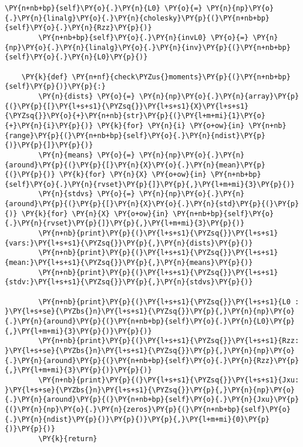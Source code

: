 \begin{tcolorbox}[breakable, size=fbox, boxrule=1pt, pad at break*=1mm,colback=cellbackground, colframe=cellborder]
\begin{Verbatim}[commandchars=\\\{\}]
        \PY{n+nb+bp}{self}\PY{o}{.}\PY{n}{L0} \PY{o}{=} \PY{n}{np}\PY{o}{.}\PY{n}{linalg}\PY{o}{.}\PY{n}{cholesky}\PY{p}{(}\PY{n+nb+bp}{self}\PY{o}{.}\PY{n}{Rzz}\PY{p}{)}
        \PY{n+nb+bp}{self}\PY{o}{.}\PY{n}{invL0} \PY{o}{=} \PY{n}{np}\PY{o}{.}\PY{n}{linalg}\PY{o}{.}\PY{n}{inv}\PY{p}{(}\PY{n+nb+bp}{self}\PY{o}{.}\PY{n}{L0}\PY{p}{)}

    \PY{k}{def} \PY{n+nf}{check\PYZus{}moments}\PY{p}{(}\PY{n+nb+bp}{self}\PY{p}{)}\PY{p}{:}
        \PY{n}{dists} \PY{o}{=} \PY{n}{np}\PY{o}{.}\PY{n}{array}\PY{p}{(}\PY{p}{[}\PY{l+s+s1}{\PYZsq{}}\PY{l+s+s1}{X}\PY{l+s+s1}{\PYZsq{}}\PY{o}{+}\PY{n+nb}{str}\PY{p}{(}\PY{l+m+mi}{1}\PY{o}{+}\PY{n}{i}\PY{p}{)} \PY{k}{for} \PY{n}{i} \PY{o+ow}{in} \PY{n+nb}{range}\PY{p}{(}\PY{n+nb+bp}{self}\PY{o}{.}\PY{n}{ndist}\PY{p}{)}\PY{p}{]}\PY{p}{)}
        \PY{n}{means} \PY{o}{=} \PY{n}{np}\PY{o}{.}\PY{n}{around}\PY{p}{(}\PY{p}{[}\PY{n}{X}\PY{o}{.}\PY{n}{mean}\PY{p}{(}\PY{p}{)} \PY{k}{for} \PY{n}{X} \PY{o+ow}{in} \PY{n+nb+bp}{self}\PY{o}{.}\PY{n}{rvset}\PY{p}{]}\PY{p}{,}\PY{l+m+mi}{3}\PY{p}{)}
        \PY{n}{stdvs} \PY{o}{=} \PY{n}{np}\PY{o}{.}\PY{n}{around}\PY{p}{(}\PY{p}{[}\PY{n}{X}\PY{o}{.}\PY{n}{std}\PY{p}{(}\PY{p}{)} \PY{k}{for} \PY{n}{X} \PY{o+ow}{in} \PY{n+nb+bp}{self}\PY{o}{.}\PY{n}{rvset}\PY{p}{]}\PY{p}{,}\PY{l+m+mi}{3}\PY{p}{)}
        \PY{n+nb}{print}\PY{p}{(}\PY{l+s+s1}{\PYZsq{}}\PY{l+s+s1}{vars:}\PY{l+s+s1}{\PYZsq{}}\PY{p}{,}\PY{n}{dists}\PY{p}{)}
        \PY{n+nb}{print}\PY{p}{(}\PY{l+s+s1}{\PYZsq{}}\PY{l+s+s1}{mean:}\PY{l+s+s1}{\PYZsq{}}\PY{p}{,}\PY{n}{means}\PY{p}{)}
        \PY{n+nb}{print}\PY{p}{(}\PY{l+s+s1}{\PYZsq{}}\PY{l+s+s1}{stdv:}\PY{l+s+s1}{\PYZsq{}}\PY{p}{,}\PY{n}{stdvs}\PY{p}{)}

        \PY{n+nb}{print}\PY{p}{(}\PY{l+s+s1}{\PYZsq{}}\PY{l+s+s1}{L0 : }\PY{l+s+se}{\PYZbs{}n}\PY{l+s+s1}{\PYZsq{}}\PY{p}{,}\PY{n}{np}\PY{o}{.}\PY{n}{around}\PY{p}{(}\PY{n+nb+bp}{self}\PY{o}{.}\PY{n}{L0}\PY{p}{,}\PY{l+m+mi}{3}\PY{p}{)}\PY{p}{)}
        \PY{n+nb}{print}\PY{p}{(}\PY{l+s+s1}{\PYZsq{}}\PY{l+s+s1}{Rzz: }\PY{l+s+se}{\PYZbs{}n}\PY{l+s+s1}{\PYZsq{}}\PY{p}{,}\PY{n}{np}\PY{o}{.}\PY{n}{around}\PY{p}{(}\PY{n+nb+bp}{self}\PY{o}{.}\PY{n}{Rzz}\PY{p}{,}\PY{l+m+mi}{3}\PY{p}{)}\PY{p}{)}
        \PY{n+nb}{print}\PY{p}{(}\PY{l+s+s1}{\PYZsq{}}\PY{l+s+s1}{Jxu: }\PY{l+s+se}{\PYZbs{}n}\PY{l+s+s1}{\PYZsq{}}\PY{p}{,}\PY{n}{np}\PY{o}{.}\PY{n}{around}\PY{p}{(}\PY{n+nb+bp}{self}\PY{o}{.}\PY{n}{Jxu}\PY{p}{(}\PY{n}{np}\PY{o}{.}\PY{n}{zeros}\PY{p}{(}\PY{n+nb+bp}{self}\PY{o}{.}\PY{n}{ndist}\PY{p}{)}\PY{p}{)}\PY{p}{,}\PY{l+m+mi}{0}\PY{p}{)}\PY{p}{)}
        \PY{k}{return}


\end{Verbatim}
\end{tcolorbox}
